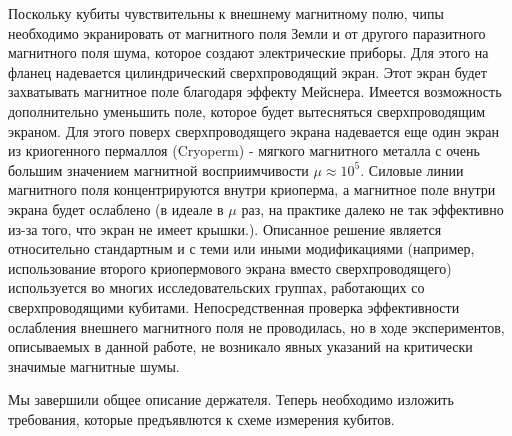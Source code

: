 Поскольку кубиты чувствительны к внешнему магнитному полю, чипы необходимо экранировать от магнитного поля Земли и от другого паразитного магнитного поля шума, которое создают электрические приборы. Для этого на фланец надевается цилиндрический сверхпроводящий экран. Этот экран будет захватывать магнитное поле благодаря эффекту Мейснера. Имеется возможность дополнительно уменьшить поле, которое будет вытесняться сверхпроводящим экраном. Для этого поверх сверхпроводящего экрана надевается еще один экран из криогенного пермаллоя (Cryoperm) - мягкого магнитного металла с очень большим значением магнитной восприимчивости $\mu \approx 10^5$. Силовые линии магнитного поля концентрируются внутри криоперма, а магнитное поле внутри экрана будет ослаблено (в идеале в $\mu$ раз, на практике далеко не так эффективно из-за того, что экран не имеет крышки.). Описанное решение является относительно стандартным и с теми или иными модификациями (например, использование второго криопермового экрана вместо сверхпроводящего) используется во многих исследовательских группах, работающих со сверхпроводящими кубитами. Непосредственная проверка эффективности ослабления внешнего магнитного поля не проводилась, но в ходе экспериментов, описываемых в данной работе, не возникало явных указаний на критически значимые магнитные шумы. 

Мы завершили общее описание держателя. Теперь необходимо изложить требования, которые предъявлются к схеме измерения кубитов.

